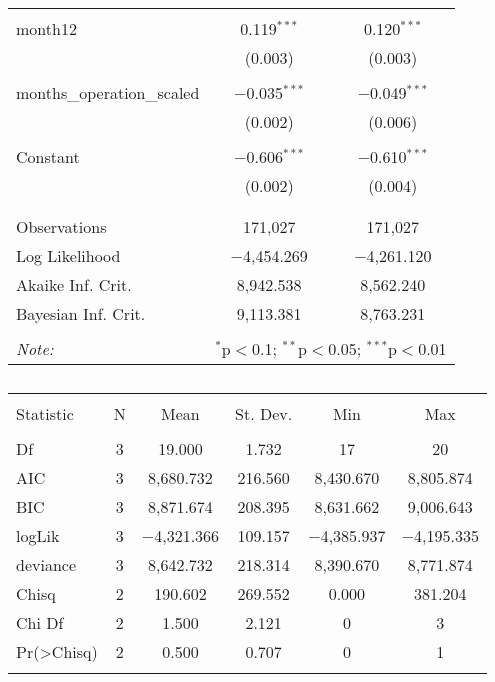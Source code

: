 \documentclass[12pt]{article}
\begin{document}
\begin{table}[!htbp]
\begin{tabular}{@{\extracolsep{5pt}}lcc}
  & & \\
 month12 & 0.119$^{***}$ & 0.120$^{***}$ \\
  & (0.003) & (0.003) \\
  & & \\
 months\_operation\_scaled & $-$0.035$^{***}$ & $-$0.049$^{***}$ \\
  & (0.002) & (0.006) \\
  & & \\
 Constant & $-$0.606$^{***}$ & $-$0.610$^{***}$ \\
  & (0.002) & (0.004) \\
  & & \\
\hline \\[-1.8ex]
Observations & 171,027 & 171,027 \\
Log Likelihood & $-$4,454.269 & $-$4,261.120 \\
Akaike Inf. Crit. & 8,942.538 & 8,562.240 \\
Bayesian Inf. Crit. & 9,113.381 & 8,763.231 \\
\hline
\hline \\[-1.8ex]
\textit{Note:}  & \multicolumn{2}{r}{$^{*}$p$<$0.1; $^{**}$p$<$0.05; $^{***}$p$<$0.01} \\
\end{tabular}
\end{table}


\begin{table}[!htbp] \centering
  \caption{}
  \label{}
\begin{tabular}{@{\extracolsep{5pt}}lccccc}
\\[-1.8ex]\hline
\hline \\[-1.8ex]
Statistic & \multicolumn{1}{c}{N} & \multicolumn{1}{c}{Mean} & \multicolumn{1}{c}{St. Dev.} & \multicolumn{1}{c}{Min} & \multicolumn{1}{c}{Max} \\
\hline \\[-1.8ex]
Df & 3 & 19.000 & 1.732 & 17 & 20 \\
AIC & 3 & 8,680.732 & 216.560 & 8,430.670 & 8,805.874 \\
BIC & 3 & 8,871.674 & 208.395 & 8,631.662 & 9,006.643 \\
logLik & 3 & $-$4,321.366 & 109.157 & $-$4,385.937 & $-$4,195.335 \\
deviance & 3 & 8,642.732 & 218.314 & 8,390.670 & 8,771.874 \\
Chisq & 2 & 190.602 & 269.552 & 0.000 & 381.204 \\
Chi Df & 2 & 1.500 & 2.121 & 0 & 3 \\
Pr(\textgreater Chisq) & 2 & 0.500 & 0.707 & 0 & 1 \\
\hline \\[-1.8ex]
\end{tabular}
\end{table}
\end{document}
